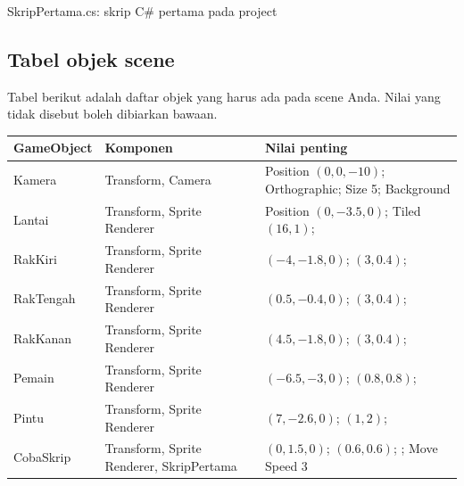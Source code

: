   {SkripPertama.cs: skrip C\# pertama pada project}

\subsection*{Tabel objek scene}

Tabel berikut adalah daftar objek yang harus ada pada scene Anda. Nilai yang
tidak disebut boleh dibiarkan bawaan.

{\footnotesize
\renewcommand{\arraystretch}{1.3}
\begin{tabularx}{\linewidth}{@{}L{2.3cm} L{3.0cm} Y@{}}
\toprule
\textbf{GameObject} & \textbf{Komponen} & \textbf{Nilai penting} \\
\midrule
Kamera & Transform, Camera &
  Position $(0,0,-10)$; Orthographic; Size 5; Background  \\
Lantai & Transform, Sprite Renderer &
  Position $(0,-3.5,0)$; Tiled $(16,1)$;  \\
RakKiri & Transform, Sprite Renderer &
  $(-4,-1.8,0)$; $(3,0.4)$;  \\
RakTengah & Transform, Sprite Renderer &
  $(0.5,-0.4,0)$; $(3,0.4)$;  \\
RakKanan & Transform, Sprite Renderer &
  $(4.5,-1.8,0)$; $(3,0.4)$;  \\
Pemain & Transform, Sprite Renderer &
  $(-6.5,-3,0)$; $(0.8,0.8)$;  \\
Pintu & Transform, Sprite Renderer &
  $(7,-2.6,0)$; $(1,2)$;  \\
CobaSkrip & Transform, Sprite Renderer, SkripPertama &
  $(0,1.5,0)$; $(0.6,0.6)$; ; Move Speed 3 \\
\bottomrule
\end{tabularx}
}



